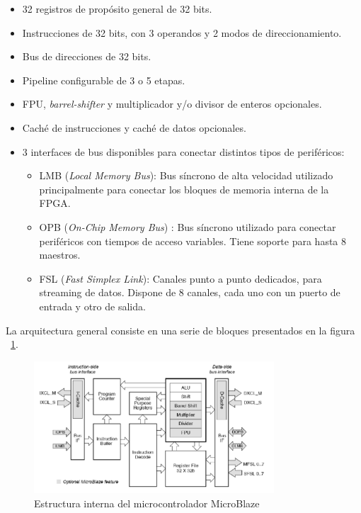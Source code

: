 	\begin{itemize}
	  \item  32 registros de propósito general de 32 bits.
	  \item  Instrucciones de 32 bits, con 3 operandos y 2 modos de direccionamiento.
	  \item  Bus de direcciones de 32 bits.
	  \item  Pipeline configurable de 3 o 5 etapas.
	  \item  FPU,\textit{ barrel-shifter} y multiplicador y/o divisor de enteros opcionales.
	  \item  Caché de instrucciones y caché de datos opcionales.
	  \item   3 interfaces de bus disponibles para conectar distintos tipos de periféricos:
		\begin{itemize}
		  \item  LMB \cite{Etiqueta23}(\textit{Local Memory Bus}): Bus síncrono de alta velocidad utilizado principalmente para conectar los bloques de memoria interna de la FPGA.
	 	 \item  OPB \cite{Etiqueta24}(\textit{On-Chip Memory Bus}) : Bus síncrono utilizado para conectar periféricos con tiempos de acceso variables. Tiene soporte para hasta 8 maestros.
	 	 \item FSL\cite{Etiqueta25} (\textit{Fast Simplex Link}): Canales punto a punto dedicados, para streaming de datos. Dispone de 8 canales, cada uno con un puerto de entrada y otro de salida.
		\end{itemize}
	\end{itemize}

La arquitectura general consiste en una serie de bloques presentados en la figura ~\ref{fig:MicoBlazer}.
		
	\begin{figure}[h!]
 	\begin{center}
  	\includegraphics[width=0.8\textwidth,keepaspectratio=true]{./images/estructuramicroblazer}
  	\caption{Estructura interna del microcontrolador MicroBlaze}
  	\label{fig:MicoBlazer}
 	\end{center}
	\end{figure}

